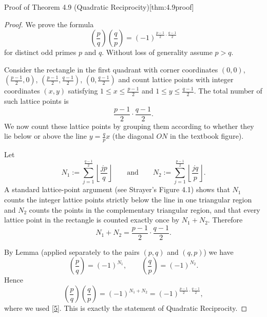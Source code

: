\documentclass[10pt]{article}
\theoremstyle{definition}
\theoremstyle{plain}
\numberwithin{equation}{section}
\begin{document}
\bigskip

\begin{define}{Proof of Theorem 4.9 (Quadratic Reciprocity)}[thm:4.9proof]
\begin{proof}
We prove the formula
\[
\left(\frac{p}{q}\right)\left(\frac{q}{p}\right)=(-1)^{\frac{p-1}{2}\cdot\frac{q-1}{2}}
\]
for distinct odd primes $p$ and $q$. Without loss of generality assume $p>q$.

Consider the rectangle in the first quadrant with corner coordinates $(0,0)$, $(\tfrac{p-1}{2},0)$, $(\tfrac{p-1}{2},\tfrac{q-1}{2})$, $(0,\tfrac{q-1}{2})$ and count lattice points with integer coordinates $(x,y)$ satisfying $1\le x\le \tfrac{p-1}{2}$ and $1\le y\le \tfrac{q-1}{2}$. The total number of such lattice points is
\[
\frac{p-1}{2}\cdot\frac{q-1}{2}.
\]
We now count these lattice points by grouping them according to whether they lie below or above the line $y=\tfrac{q}{p}x$ (the diagonal $ON$ in the textbook figure).

Let
\[
N_1:=\sum_{j=1}^{\frac{q-1}{2}} \left\lfloor\frac{j p}{q}\right\rfloor
\qquad\text{and}\qquad
N_2:=\sum_{j=1}^{\frac{p-1}{2}} \left\lfloor\frac{j q}{p}\right\rfloor .
\]
A standard lattice-point argument (see Strayer's Figure 4.1) shows that $N_1$ counts the integer lattice points strictly below the line in one triangular region and $N_2$ counts the points in the complementary triangular region, and that every lattice point in the rectangle is counted exactly once by $N_1+N_2$. Therefore
\[
N_1+N_2=\frac{p-1}{2}\cdot\frac{q-1}{2}.
\tag{5}
\]

By Lemma  (applied separately to the pairs $(p,q)$ and $(q,p)$) we have
\[
\left(\frac{p}{q}\right)=(-1)^{N_1},\qquad
\left(\frac{q}{p}\right)=(-1)^{N_2}.
\]
Hence
\[
\left(\frac{p}{q}\right)\left(\frac{q}{p}\right)=(-1)^{N_1+N_2}=(-1)^{\frac{p-1}{2}\cdot\frac{q-1}{2}},
\]
where we used \eqref{5}. This is exactly the statement of Quadratic Reciprocity.
\end{proof}
\end{define}

\bigskip
\end{document}
